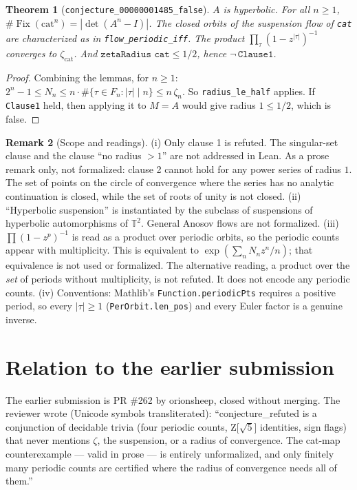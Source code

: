 \documentclass[11pt]{article}
\newtheorem{theorem}{Theorem}
\theoremstyle{definition}
\newtheorem{remark}[theorem]{Remark}
\newcommand{\Fix}{\operatorname{Fix}}
\newcommand{\T}{\mathbb{T}}
\begin{document}
\begin{theorem}[\texttt{conjecture\_00000001485\_false}]
$A$ is hyperbolic. For all $n\ge1$, $\#\Fix(\mathrm{cat}^n)=|\det(A^n-I)|$. The closed orbits of the
suspension flow of \texttt{cat} are characterized as in \texttt{flow\_periodic\_iff}. The product
$\prod_\tau(1-z^{|\tau|})^{-1}$ converges to $\zeta_{\mathrm{cat}}$. And
$\texttt{zetaRadius cat}\le1/2$, hence $\neg\,\texttt{Clause1}$.
\end{theorem}
\begin{proof}
Combining the lemmas, for $n\ge1$: $2^n-1\le N_n\le n\cdot\#\{\tau\in F_n:|\tau|\mid n\}\le n\,\zeta_n$.
So \texttt{radius\_le\_half} applies. If \texttt{Clause1} held, then applying it to $M=A$ would give
radius $1\le1/2$, which is false.
\end{proof}

\begin{remark}[Scope and readings]\label{rem:scope}
(i) Only clause 1 is refuted. The singular-set clause and the clause ``no radius $>1$'' are not
addressed in Lean. As a prose remark only, not formalized: clause 2 cannot hold for any power series
of radius $1$. The set of points on the circle of convergence where the series has no analytic
continuation is closed, while the set of roots of unity is not closed.
(ii) ``Hyperbolic suspension'' is instantiated by the subclass of suspensions of hyperbolic
automorphisms of $\T^2$. General Anosov flows are not formalized.
(iii) $\prod(1-z^p)^{-1}$ is read as a product over periodic orbits, so the periodic counts appear
with multiplicity. This is equivalent to $\exp(\sum_n N_n z^n/n)$; that equivalence is not used or
formalized. The alternative reading, a product over the \emph{set} of periods without multiplicity,
is not refuted. It does not encode any periodic counts.
(iv) Conventions: Mathlib's \texttt{Function.periodicPts} requires a positive period, so every
$|\tau|\ge1$ (\texttt{PerOrbit.len\_pos}) and every Euler factor is a genuine inverse.
\end{remark}

\section{Relation to the earlier submission}

The earlier submission is PR \#262 by orionsheep, closed without merging. The reviewer wrote (Unicode
symbols transliterated): ``conjecture\_refuted is a conjunction of decidable trivia (four periodic
counts, Z[$\sqrt5$] identities, sign flags) that never mentions $\zeta$, the suspension, or a radius
of convergence. The cat-map counterexample --- valid in prose --- is entirely unformalized, and only
finitely many periodic counts are certified where the radius of convergence needs all of them.''
\end{document}
